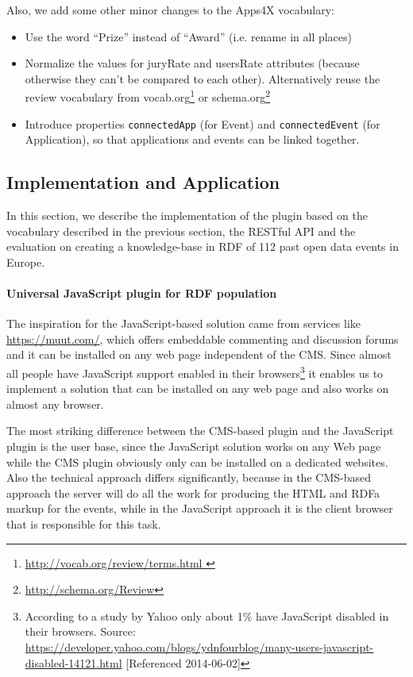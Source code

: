 Also, we add some other minor changes to the Apps4X vocabulary:
\begin{itemize}
\item Use the word ``Prize'' instead of ``Award'' (i.e. rename in all places)
\item Normalize the values for juryRate and usersRate attributes (because otherwise they can't be compared to each other). Alternatively reuse the review vocabulary from vocab.org\footnote{\url{http://vocab.org/review/terms.html }}  or schema.org\footnote{\url{http://schema.org/Review}}
\item Introduce properties \texttt{connectedApp} (for Event) and \texttt{connectedEvent} (for Application), so that applications and events can be linked together.
\end{itemize}


\subsection{Implementation and Application}
\label{sec:plugin}
In this section, we describe the implementation of the plugin based on the vocabulary described in the previous section, the RESTful API and the evaluation on creating a knowledge-base in RDF of 112 past open data events in Europe.  

\paragraph{Universal JavaScript plugin for RDF population}
\label{sec:universal}

The inspiration for the JavaScript-based solution came from services like \url{https://muut.com/}, which offers embeddable commenting and discussion forums and it can be installed on any web page independent of the CMS. Since almost all people have JavaScript support enabled in their browsers\footnote{According to a study by Yahoo only about 1\% have JavaScript disabled in their browsers. Source: \url{https://developer.yahoo.com/blogs/ydnfourblog/many-users-javascript-disabled-14121.html} [Referenced 2014-06-02]}  it enables us to implement a solution that can be installed on any web page and also works on almost any browser.

The most striking difference between the CMS-based plugin and the JavaScript plugin is the user base, since the JavaScript solution works on any Web page while the CMS plugin obviously only can be installed on a dedicated websites. Also the technical approach differs significantly, because in the CMS-based approach the server will do all the work for producing the HTML and RDFa markup for the events, while in the JavaScript approach it is the client browser that is responsible for this task.


